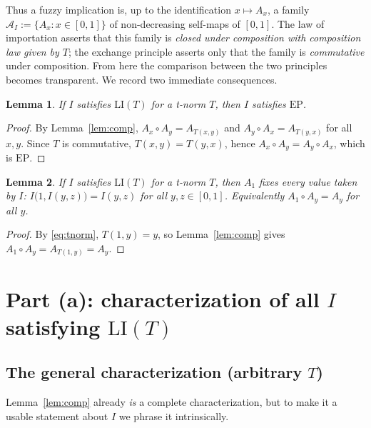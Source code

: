 \documentclass{amsart}
\newtheorem{lemma}{Lemma}
\theoremstyle{definition}
\theoremstyle{remark}
\newcommand{\zo}{[0,1]}
\newcommand{\LI}{\mathrm{LI}}
\newcommand{\EP}{\mathrm{EP}}
\newcommand{\Ax}{A}
\begin{document}
Thus a fuzzy implication is, up to the identification $x\mapsto \Ax_x$, a family
$\mathcal{A}_I:=\{\Ax_x:x\in\zo\}$ of non-decreasing self-maps of $\zo$. The law of
importation asserts that this family is \emph{closed under composition with composition
law given by $T$}; the exchange principle asserts only that the family is
\emph{commutative} under composition. From here the comparison between the two
principles becomes transparent. We record two immediate consequences.

\begin{lemma}\label{lem:LIimpliesEP}
If $I$ satisfies $\LI(T)$ for a t-norm $T$, then $I$ satisfies $\EP$.
\end{lemma}

\begin{proof}
By Lemma~\ref{lem:comp}, $\Ax_x\circ \Ax_y=\Ax_{T(x,y)}$ and $\Ax_y\circ \Ax_x=\Ax_{T(y,x)}$
for all $x,y$. Since $T$ is commutative, $T(x,y)=T(y,x)$, hence
$\Ax_x\circ \Ax_y=\Ax_y\circ \Ax_x$, which is $\EP$.
\end{proof}

\begin{lemma}\label{lem:neutral}
If $I$ satisfies $\LI(T)$ for a t-norm $T$, then $\Ax_1$ fixes every value taken by $I$:
$I\bigl(1,I(y,z)\bigr)=I(y,z)$ for all $y,z\in\zo$. Equivalently $\Ax_1\circ \Ax_y=\Ax_y$
for all $y$.
\end{lemma}

\begin{proof}
By \eqref{eq:tnorm}, $T(1,y)=y$, so Lemma~\ref{lem:comp} gives
$\Ax_1\circ \Ax_y=\Ax_{T(1,y)}=\Ax_y$.
\end{proof}

\section{Part (a): characterization of all $I$ satisfying $\LI(T)$}

\subsection{The general characterization (arbitrary $T$)}

Lemma~\ref{lem:comp} already \emph{is} a complete characterization, but to make it a
usable statement about $I$ we phrase it intrinsically.
\end{document}
